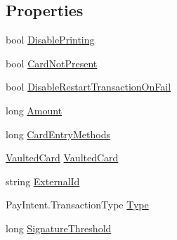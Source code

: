 \subsection*{Properties}
\begin{DoxyCompactItemize}
\item 
bool \hyperlink{classcom_1_1clover_1_1remotepay_1_1sdk_1_1_transaction_request_a73ad65561a435eec180a965a022df599}{Disable\+Printing}
\item 
bool \hyperlink{classcom_1_1clover_1_1remotepay_1_1sdk_1_1_transaction_request_aaeb599e4f351ec6c1fdb1e84d6a5462d}{Card\+Not\+Present}
\item 
bool \hyperlink{classcom_1_1clover_1_1remotepay_1_1sdk_1_1_transaction_request_a2c3ef5c96f6cc44d23fcaffad8e4fb72}{Disable\+Restart\+Transaction\+On\+Fail}
\item 
long \hyperlink{classcom_1_1clover_1_1remotepay_1_1sdk_1_1_transaction_request_ad7cf74d6782da8302064c64b1252fb3d}{Amount}
\item 
long \hyperlink{classcom_1_1clover_1_1remotepay_1_1sdk_1_1_transaction_request_a4829b6143b0aafbdeb01fd3b0890a9df}{Card\+Entry\+Methods}
\item 
\hyperlink{classcom_1_1clover_1_1sdk_1_1v3_1_1payments_1_1_vaulted_card}{Vaulted\+Card} \hyperlink{classcom_1_1clover_1_1remotepay_1_1sdk_1_1_transaction_request_ae2d37e0e485e6f21143863a4fe64fdf3}{Vaulted\+Card}
\item 
string \hyperlink{classcom_1_1clover_1_1remotepay_1_1sdk_1_1_transaction_request_a22893243d0037c1908eae6f5b6ab8699}{External\+Id}
\item 
Pay\+Intent.\+Transaction\+Type \hyperlink{classcom_1_1clover_1_1remotepay_1_1sdk_1_1_transaction_request_a4abe56da182f50bea73e6d48d3404962}{Type}
\item 
long \hyperlink{classcom_1_1clover_1_1remotepay_1_1sdk_1_1_transaction_request_a3614bbd641e9a7a9822008d90f75ecfe}{Signature\+Threshold}

\end{DoxyCompactItemize}
